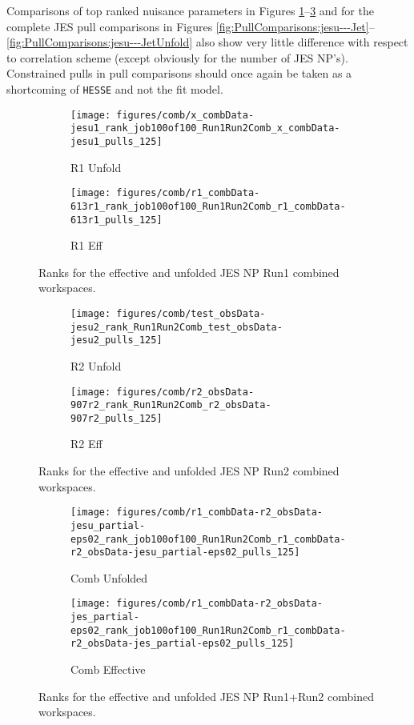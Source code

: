 Comparisons of top ranked nuisance parameters in Figures \ref{fig:Ranks:jesu1}--\ref{fig:Ranks:jesuc} and for the complete JES pull comparisons in Figures \ref{fig:PullComparisons:jesu---Jet}--\ref{fig:PullComparisons:jesu---JetUnfold} also show very little difference with respect to correlation scheme (except obviously for the number of JES NP's).  Constrained pulls in pull comparisons should once again be taken as a shortcoming of \texttt{HESSE} and not the fit model.
\begin{figure}[!htbp]\captionsetup{justification=centering}
  \centering
\begin{subfigure}[t]{0.35000\textwidth}\centering\texttt{[image: figures/comb/x\_combData-jesu1\_rank\_job100of100\_Run1Run2Comb\_x\_combData-jesu1\_pulls\_125]}\caption{R1 Unfold}\end{subfigure}
\begin{subfigure}[t]{0.35000\textwidth}\centering\texttt{[image: figures/comb/r1\_combData-613r1\_rank\_job100of100\_Run1Run2Comb\_r1\_combData-613r1\_pulls\_125]}\caption{R1 Eff}\end{subfigure}
  \caption{Ranks for the effective and unfolded JES NP Run1 combined workspaces.}
    \label{fig:Ranks:jesu1}
\end{figure}

\begin{figure}[!htbp]\captionsetup{justification=centering}
  \centering
\begin{subfigure}[t]{0.35000\textwidth}\centering\texttt{[image: figures/comb/test\_obsData-jesu2\_rank\_Run1Run2Comb\_test\_obsData-jesu2\_pulls\_125]}\caption{R2 Unfold}\end{subfigure}
\begin{subfigure}[t]{0.35000\textwidth}\centering\texttt{[image: figures/comb/r2\_obsData-907r2\_rank\_Run1Run2Comb\_r2\_obsData-907r2\_pulls\_125]}\caption{R2 Eff}\end{subfigure}
  \caption{Ranks for the effective and unfolded JES NP Run2 combined workspaces.}
    \label{fig:Ranks:jesu2}
\end{figure}

\begin{figure}[!htbp]\captionsetup{justification=centering}
  \centering
\begin{subfigure}[t]{0.35\textwidth}\centering\texttt{[image: figures/comb/r1\_combData-r2\_obsData-jesu\_partial-eps02\_rank\_job100of100\_Run1Run2Comb\_r1\_combData-r2\_obsData-jesu\_partial-eps02\_pulls\_125]}\caption{Comb Unfolded}\end{subfigure}
\begin{subfigure}[t]{0.35\textwidth}\centering\texttt{[image: figures/comb/r1\_combData-r2\_obsData-jes\_partial-eps02\_rank\_job100of100\_Run1Run2Comb\_r1\_combData-r2\_obsData-jes\_partial-eps02\_pulls\_125]}\caption{Comb Effective}\end{subfigure}
  \caption{Ranks for the effective and unfolded JES NP Run1+Run2 combined workspaces.}
    \label{fig:Ranks:jesuc}
\end{figure}

